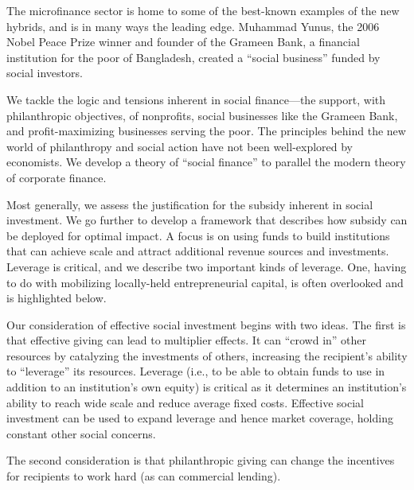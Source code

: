 \documentclass[letterpaper, 12pt]{article}
\begin{document}

The microfinance sector is home to some of the best-known examples of the new hybrids, and is in many ways the leading edge. Muhammad Yunus, the 2006 Nobel Peace Prize winner and founder of the Grameen Bank, a financial institution for the poor of Bangladesh, created a ``social business'' funded by social investors.

We tackle the logic and tensions inherent in social finance---the support, with philanthropic objectives, of nonprofits, social businesses
like the Grameen Bank, and profit-maximizing businesses serving the poor. The principles behind the new world of philanthropy and social
action have not been well-explored by economists. We develop a theory of ``social finance'' to parallel the modern theory of corporate finance.


Most generally, we assess the justification for the subsidy inherent in social investment. We go further to develop a framework that describes
how subsidy can be deployed for optimal impact. A focus is on using funds to build institutions that can achieve scale and attract additional revenue sources and investments. Leverage is critical, and we describe two important kinds of leverage. One, having to do with mobilizing locally-held entrepreneurial capital, is often overlooked and is highlighted below.

Our consideration of effective social investment begins with two ideas. The first is that effective giving can lead to multiplier effects. It can ``crowd in'' other resources by catalyzing the investments of others, increasing the recipient's ability to ``leverage'' its resources. Leverage (i.e., to be able to obtain funds to use in addition to an institution's own equity) is critical as it determines an institution's ability to reach wide scale and reduce average fixed costs. Effective social investment can be used to expand leverage and hence market coverage, holding constant other social concerns.

The second consideration is that philanthropic giving can change the incentives for recipients to work hard (as can commercial lending).
\end{document}
